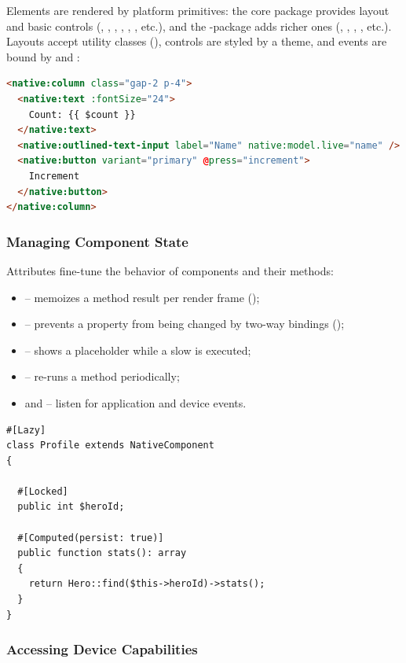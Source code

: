 \noindent Elements are rendered by platform primitives: the core package provides layout and
basic controls (, , , , , , etc.),
and the -package adds richer ones (, ,
, , etc.). Layouts accept utility classes
(), controls are styled by a theme, and events are bound by  and
:

\newpage
\begin{lstlisting}[language=HTML]
<native:column class="gap-2 p-4">
  <native:text :fontSize="24">
    Count: {{ $count }}
  </native:text>
  <native:outlined-text-input label="Name" native:model.live="name" />
  <native:button variant="primary" @press="increment">
    Increment
  </native:button>
</native:column>
\end{lstlisting}


\subsubsection{Managing Component State}

Attributes fine-tune the behavior of components and their methods:

\begin{itemize}
  \item \q{\#[Computed]} -- memoizes a method result per render frame ();
  \item \q{\#[Locked]} -- prevents a property from being changed by two-way bindings ();
  \item \q{\#[Lazy]} -- shows a placeholder while a slow  is executed;
  \item \q{\#[Poll]} -- re-runs a method periodically;
  \item \q{\#[On]} and \q{\#[OnNative]} -- listen for application and device events.
\end{itemize}

\begin{lstlisting}
#[Lazy]
class Profile extends NativeComponent
{

  #[Locked]
  public int $heroId;

  #[Computed(persist: true)]
  public function stats(): array
  {
    return Hero::find($this->heroId)->stats();
  }
}
\end{lstlisting}


\subsubsection{Accessing Device Capabilities}

